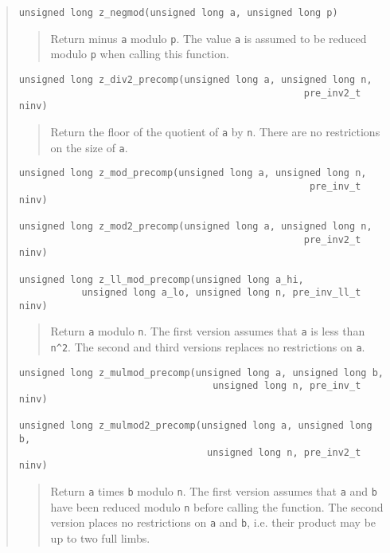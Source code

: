 \documentclass[a4paper,10pt]{article}
\newcommand{\code}{\lstinline}
\begin{document}
\begin{quote}
\begin{lstlisting}
unsigned long z_negmod(unsigned long a, unsigned long p)
\end{lstlisting}
\begin{quote}
Return minus \code{a} modulo \code{p}. The value \code{a} is assumed to be reduced modulo \code{p} when calling this function. 
\end{quote}

\begin{lstlisting}
unsigned long z_div2_precomp(unsigned long a, unsigned long n, 
                                                  pre_inv2_t ninv)
\end{lstlisting}
\begin{quote}
Return the floor of the quotient of \code{a} by \code{n}. There are no restrictions on the size of \code{a}.
\end{quote}

\begin{lstlisting}
unsigned long z_mod_precomp(unsigned long a, unsigned long n, 
                                                   pre_inv_t ninv)

unsigned long z_mod2_precomp(unsigned long a, unsigned long n, 
                                                  pre_inv2_t ninv)

unsigned long z_ll_mod_precomp(unsigned long a_hi,
           unsigned long a_lo, unsigned long n, pre_inv_ll_t ninv)
\end{lstlisting}
\begin{quote}
Return \code{a} modulo \code{n}. The first version assumes that \code{a} is less than \code{n^2}. The second and third versions replaces no restrictions on \code{a}.
\end{quote}

\begin{lstlisting}
unsigned long z_mulmod_precomp(unsigned long a, unsigned long b, 
                                  unsigned long n, pre_inv_t ninv)
                                         
unsigned long z_mulmod2_precomp(unsigned long a, unsigned long b, 
                                 unsigned long n, pre_inv2_t ninv)
\end{lstlisting}
\begin{quote}
Return \code{a} times \code{b} modulo \code{n}. The first version assumes that \code{a} and \code{b} have been reduced modulo \code{n} before calling the function. The second version places no restrictions on \code{a} and \code{b}, i.e. their product may be up to two full limbs.
\end{quote}
                                         

\end{quote}
\end{document}
